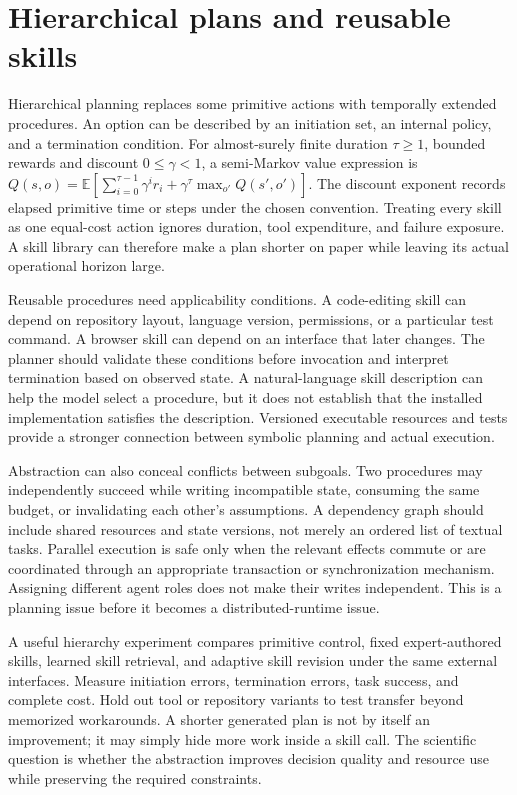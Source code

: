 \section{Hierarchical plans and reusable skills}
\label{sec:C10:hierarchy}
Hierarchical planning replaces some primitive actions with temporally extended procedures. An option can be described by an initiation set, an internal policy, and a termination condition. For almost-surely finite duration $\tau\geq1$, bounded rewards and discount $0\leq\gamma<1$, a semi-Markov value expression is $Q(s,o)=\mathbb E[\sum_{i=0}^{\tau-1}\gamma^ir_i+\gamma^\tau\max_{o'}Q(s',o')]$. The discount exponent records elapsed primitive time or steps under the chosen convention. Treating every skill as one equal-cost action ignores duration, tool expenditure, and failure exposure. A skill library can therefore make a plan shorter on paper while leaving its actual operational horizon large.

Reusable procedures need applicability conditions. A code-editing skill can depend on repository layout, language version, permissions, or a particular test command. A browser skill can depend on an interface that later changes. The planner should validate these conditions before invocation and interpret termination based on observed state. A natural-language skill description can help the model select a procedure, but it does not establish that the installed implementation satisfies the description. Versioned executable resources and tests provide a stronger connection between symbolic planning and actual execution.

Abstraction can also conceal conflicts between subgoals. Two procedures may independently succeed while writing incompatible state, consuming the same budget, or invalidating each other's assumptions. A dependency graph should include shared resources and state versions, not merely an ordered list of textual tasks. Parallel execution is safe only when the relevant effects commute or are coordinated through an appropriate transaction or synchronization mechanism. Assigning different agent roles does not make their writes independent. This is a planning issue before it becomes a distributed-runtime issue.

A useful hierarchy experiment compares primitive control, fixed expert-authored skills, learned skill retrieval, and adaptive skill revision under the same external interfaces. Measure initiation errors, termination errors, task success, and complete cost. Hold out tool or repository variants to test transfer beyond memorized workarounds. A shorter generated plan is not by itself an improvement; it may simply hide more work inside a skill call. The scientific question is whether the abstraction improves decision quality and resource use while preserving the required constraints.

